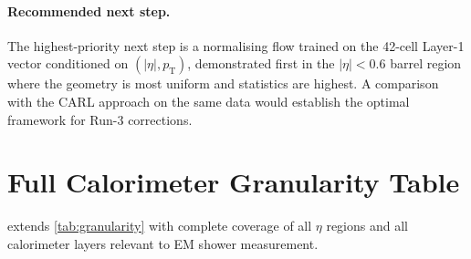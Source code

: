 \documentclass[11pt,a4paper]{article}
\newcommand{\abseta}{|\eta|}
\begin{document}
\paragraph{Recommended next step.}
The highest-priority next step is a normalising flow trained on the
42-cell Layer-1 vector conditioned on $(\abseta, p_\mathrm{T})$,
demonstrated first in the $\abseta < 0.6$ barrel region where the
geometry is most uniform and statistics are highest.  A comparison
with the CARL approach on the same data would establish the
optimal framework for Run-3 corrections.

\appendix

\section{Full Calorimeter Granularity Table}
\label{app:granularity}

 extends \cref{tab:granularity} with
complete coverage of all $\eta$ regions and all calorimeter layers
relevant to EM shower measurement.
\end{document}
